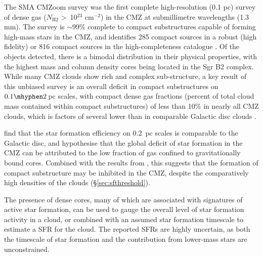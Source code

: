The SMA CMZoom survey \citep{Battersby2020, Hatchfield2020} was the first complete high-resolution (0.1 pc) survey of dense gas ($N_\mathrm{H2}$ \textgreater\ 10$^{23}$ cm$^{-2}$) in the CMZ at submillimetre wavelengths (1.3 mm). The survey is $\sim$99\% complete to compact substructures capable of forming high-mass stars in the CMZ, and identifies 285 compact sources in a robust (high fidelity) or 816 compact sources in the high-completeness catalogue \citep{Hatchfield2020}. Of the objects detected, there is a bimodal distribution in their physical properties, with the highest mass and column density cores being located in the Sgr B2 complex. While many CMZ clouds show rich and complex sub-structure, a key result of this unbiased survey is an overall deficit in compact substructures on $0.1\mhyphen2$\,pc scales, with compact dense gas fractions (percent of total cloud mass contained within compact substructures) of less than 10\% in nearly all CMZ clouds, which is factors of several lower than in comparable Galactic disc clouds \citep{Battersby2020}. 

\citet{Lu2019b} find that the star formation efficiency on 0.2~pc scales is comparable to the Galactic disc, and hypothesise that the global deficit of star formation in the CMZ can be attributed to the low fraction of gas confined to gravitationally bound cores. Combined with the results from \citet{Battersby2020}, this suggests that the formation of compact substructure may be inhibited in the CMZ, despite the comparatively high densities of the clouds (\S\ref{sec:sfthreshold}).

The presence of dense cores, many of which are associated with signatures of active star formation, can be used to gauge the overall level of star formation activity in a cloud, or combined with an assumed star formation timescale to estimate a SFR for the cloud. The reported SFRs are highly uncertain, as both the timescale of star formation and the contribution from lower-mass stars are unconstrained.

